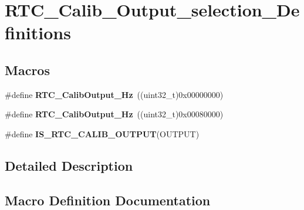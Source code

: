 \hypertarget{group___r_t_c___calib___output__selection___definitions}{}\section{R\+T\+C\+\_\+\+Calib\+\_\+\+Output\+\_\+selection\+\_\+\+Definitions}
\label{group___r_t_c___calib___output__selection___definitions}
\subsection*{Macros}
\begin{DoxyCompactItemize}
\item 
\hypertarget{group___r_t_c___calib___output__selection___definitions_gab689d5d180e58a9d5054481d59d45767}{}\#define {\bfseries R\+T\+C\+\_\+\+Calib\+Output\+\_\+Hz}~((uint32\+\_\+t)0x00000000)\label{group___r_t_c___calib___output__selection___definitions_gab689d5d180e58a9d5054481d59d45767}

\item 
\hypertarget{group___r_t_c___calib___output__selection___definitions_gaea4082d5ce14a94a602e40e0398125bd}{}\#define {\bfseries R\+T\+C\+\_\+\+Calib\+Output\+\_\+Hz}~((uint32\+\_\+t)0x00080000)\label{group___r_t_c___calib___output__selection___definitions_gaea4082d5ce14a94a602e40e0398125bd}

\item 
\#define {\bfseries I\+S\+\_\+\+R\+T\+C\+\_\+\+C\+A\+L\+I\+B\+\_\+\+O\+U\+T\+P\+U\+T}(O\+U\+T\+P\+U\+T)
\end{DoxyCompactItemize}


\subsection{Detailed Description}


\subsection{Macro Definition Documentation}
\hypertarget{group___r_t_c___calib___output__selection___definitions_gae8326e278569669e6880388c85cd890a}{}
